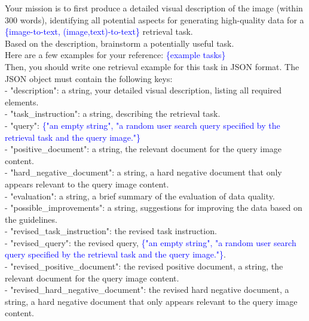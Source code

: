 \begin{figure*}[t]
\centering
\begin{prompt}[title={Prompt: Synthesizing Retrieval Data (Only Query Image)}, label=prompt:ret_one_image]

Your mission is to first produce a detailed visual description of the image (within 300 words), identifying all potential aspects for generating high-quality data for a \textcolor{blue}{\{image-to-text, (image,text)-to-text\}} retrieval task.\\
    
Based on the description, brainstorm a potentially useful task. \\

Here are a few examples for your reference:
\textcolor{blue}{\{example tasks\}} \\

Then, you should write one retrieval example for this task in JSON format. The JSON object must contain the following keys: \\

- "description": a string, your detailed visual description, listing all required elements. \\
- "task\_instruction": a string, describing the retrieval task. \\
- "query": \textcolor{blue}{\{"an empty string", "a random user search query specified by the retrieval task and the query image."\}} \\
- "positive\_document": a string, the relevant document for the query image content. \\
- "hard\_negative\_document": a string, a hard negative document that only appears relevant to the query image content. \\
- "evaluation": a string, a brief summary of the evaluation of data quality. \\
- "possible\_improvements": a string, suggestions for improving the data based on the guidelines. \\
- "revised\_task\_instruction": the revised task instruction. \\
- "revised\_query": the revised query, \textcolor{blue}{\{"an empty string", "a random user search query specified by the retrieval task and the query image."\}}. \\
- "revised\_positive\_document": the revised positive document, a string, the relevant document for the query image content. \\
- "revised\_hard\_negative\_document": the revised hard negative document, a string, a hard negative document that only appears relevant to the query image content. \\


\end{prompt}
\end{figure*}
